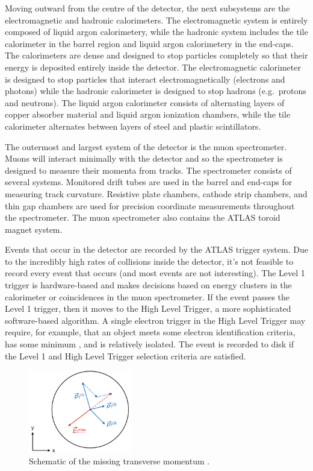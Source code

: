Moving outward from the centre of the detector, the next subsystems are the electromagnetic and hadronic calorimeters. The electromagnetic system is entirely composed of liquid argon calorimetery, while the hadronic system includes the tile calorimeter in the barrel region and liquid argon calorimetery in the end-caps. The calorimeters are dense and designed to stop particles completely so that their energy is deposited entirely inside the detector. The electromagnetic calorimeter is designed to stop particles that interact electromagnetically (electrons and photons) while the hadronic calorimeter is designed to stop hadrons (e.g.\ protons and neutrons). The liquid argon calorimeter consists of alternating layers of copper absorber material and liquid argon ionization chambers, while the tile calorimeter alternates between layers of steel and plastic scintillators. 

The outermost and largest system of the detector is the muon spectrometer. Muons will interact minimally with the detector and so the spectrometer is designed to measure their momenta from tracks. The spectrometer consists of several systems. Monitored drift tubes are used in the barrel and end-caps for measuring track curvature. Resistive plate chambers, cathode strip chambers, and thin gap chambers are used for precision coordinate measurements throughout the spectrometer. The muon spectrometer also contains the ATLAS toroid magnet system.

Events that occur in the detector are recorded by the ATLAS trigger system. Due to the incredibly high rates of collisions inside the detector, it's not feasible to record every event that occurs (and most events are not interesting). The Level 1 trigger is hardware-based and makes decisions based on energy clusters in the calorimeter or coincidences in the muon spectrometer. If the event passes the Level 1 trigger, then it moves to the High Level Trigger, a more sophisticated software-based algorithm. A single electron trigger in the High Level Trigger may require, for example, that an object meets some electron identification criteria, has some minimum \pt, and is relatively isolated. The event is recorded to disk if the Level 1 and High Level Trigger selection criteria are satisfied.

\begin{figure}[!htb]
\centering
\includegraphics[width=0.4\textwidth]{Figures/etmiss.png}
\caption{Schematic of the missing transverse momentum \etmissvec.}
\label{fig:etmiss}
\end{figure}

